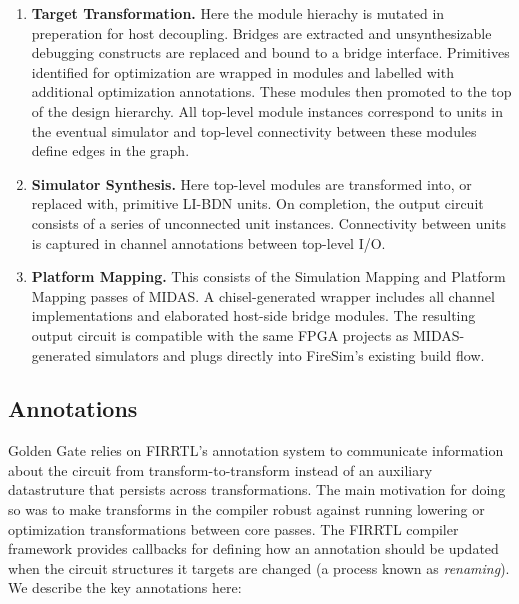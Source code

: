 \begin{enumerate}

\item \textbf{Target Transformation.} Here the
module hierachy is mutated in preperation for host decoupling. Bridges are
extracted and unsynthesizable debugging constructs are replaced and
bound to a bridge interface. Primitives identified for optimization are
wrapped in modules and labelled with additional optimization annotations. These modules then promoted to the top of the design hierarchy. 
All top-level module instances correspond to units in the eventual
simulator and top-level connectivity between these modules define edges in the graph.

\item \textbf{Simulator Synthesis.} Here top-level modules are transformed
into, or replaced with, primitive LI-BDN units. On completion, the output circuit consists of a
series of unconnected unit instances. Connectivity between units is captured in
channel annotations between top-level I/O.

\item \textbf{Platform Mapping.} This consists of the Simulation Mapping and
Platform Mapping passes of MIDAS. A chisel-generated wrapper includes all
channel implementations and elaborated host-side bridge modules. The resulting output
circuit is compatible with the same FPGA projects as MIDAS-generated
simulators and plugs directly into FireSim's existing build flow.
\end{enumerate}

\subsection{Annotations}
Golden Gate relies on FIRRTL's annotation system to communicate information about the
circuit from transform-to-transform instead of an auxiliary
datastruture that persists across transformations. The main motivation for doing so was to make transforms in the
compiler robust against running lowering or optimization transformations
between core passes. The FIRRTL compiler framework provides callbacks for defining
how an annotation should be updated when the circuit structures it targets are
changed (a process known as \emph{renaming}). We describe the key annotations here:

